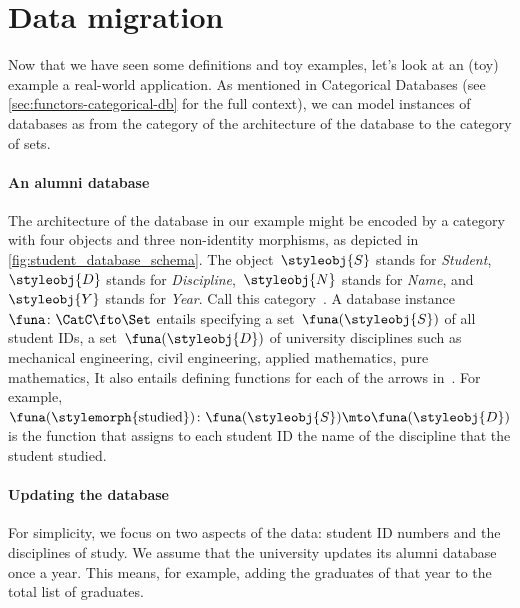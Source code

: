 \clearpage
\section{Data migration}
Now that we have seen some definitions and toy examples, let's look at an (toy) example a real-world application.
As mentioned in Categorical Databases (see \ref{sec:functors-categorical-db} for the full context),
we can model instances of databases as  from the category of the architecture of the database to the category of sets.

\paragraph{An alumni database}

%
\begin{marginfigure}
    \centering
    \caption{The schema of an alumni database.}
    \label{fig:student_database_schema}
\end{marginfigure}
%

The architecture of the database in our example might be encoded by a category with four objects and three non-identity morphisms, as depicted in \cref{fig:student_database_schema}.
The object~$\styleobj{S}$ stands for \emph{Student},~$\styleobj{D}$ stands for \emph{Discipline},~$\styleobj{N}$ stands for \emph{Name}, and~$\styleobj{Y}$ stands for \emph{Year}.
Call this category~\CatC.
A database instance~$\funa \colon \CatC \fto \Set$ entails specifying a set~$\funa(\styleobj{S})$ of all student IDs, a set~$\funa(\styleobj{D})$ of university disciplines such as mechanical engineering, civil engineering, applied mathematics, pure mathematics, \etc
It also entails defining functions for each of the arrows in~\CatC.
For example,~$\funa(\stylemorph{\text{studied}}) \colon \funa(\styleobj{S}) \mto \funa(\styleobj{D})$ is the function that assigns to each student ID the name of the discipline that the student studied.

\paragraph{Updating the database}

For simplicity, we focus on two aspects of the data: student ID numbers and the disciplines of study.
We assume that the university updates its alumni database once a year.
This means, for example, adding the graduates of that year to the total list of graduates.

